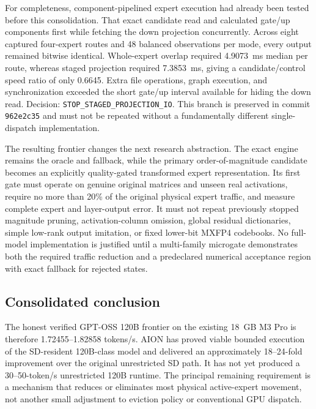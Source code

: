 For completeness, component-pipelined expert execution had already been tested
before this consolidation.  That exact candidate read and calculated gate/up
components first while fetching the down projection concurrently.  Across
eight captured four-expert routes and 48 balanced observations per mode, every
output remained bitwise identical.  Whole-expert overlap required 4.9073~ms
median per route, whereas staged projection required 7.3853~ms, giving a
candidate/control speed ratio of only 0.6645.  Extra file operations, graph
execution, and synchronization exceeded the short gate/up interval available
for hiding the down read.  Decision:
\texttt{STOP\_STAGED\_PROJECTION\_IO}.  This branch is preserved in commit
\texttt{962e2c35} and must not be repeated without a fundamentally different
single-dispatch implementation.

The resulting frontier changes the next research abstraction.  The exact
engine remains the oracle and fallback, while the primary order-of-magnitude
candidate becomes an explicitly quality-gated transformed expert
representation.  Its first gate must operate on genuine original matrices and
unseen real activations, require no more than 20\% of the original physical
expert traffic, and measure complete expert and layer-output error.  It must not
repeat previously stopped magnitude pruning, activation-column omission,
global residual dictionaries, simple low-rank output imitation, or fixed
lower-bit MXFP4 codebooks.  No full-model implementation is justified until a
multi-family microgate demonstrates both the required traffic reduction and a
predeclared numerical acceptance region with exact fallback for rejected
states.

\subsection{Consolidated conclusion}

The honest verified GPT-OSS 120B frontier on the existing 18~GB M3 Pro is
therefore 1.72455--1.82858 tokens/s.  AION has proved viable bounded execution
of the SD-resident 120B-class model and delivered an approximately 18--24-fold
improvement over the original unrestricted SD path.  It has not yet produced a
30--50-token/s unrestricted 120B runtime.  The principal remaining requirement
is a mechanism that reduces or eliminates most physical active-expert movement,
not another small adjustment to eviction policy or conventional GPU dispatch.
